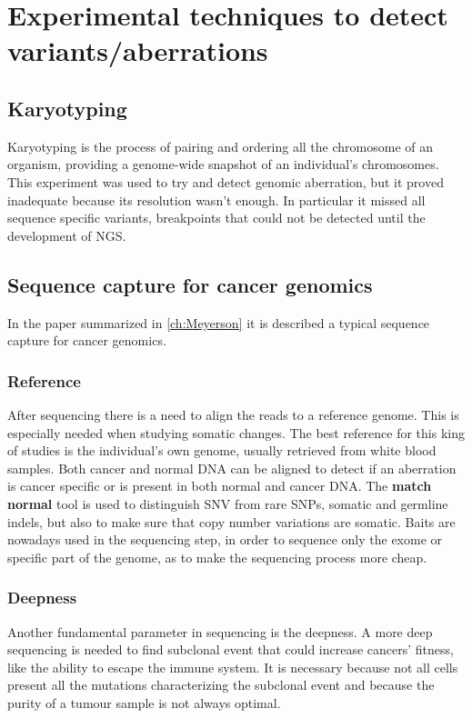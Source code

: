 \section{Experimental techniques to detect variants/aberrations}

	\subsection{Karyotyping}
	Karyotyping is the process of pairing and ordering all the chromosome of an organism, providing a genome-wide snapshot of an individual's chromosomes.
	This experiment was used to try and detect genomic aberration, but it proved inadequate because its resolution wasn't enough.
	In particular it missed all sequence specific variants, breakpoints that could not be detected until the development of NGS.

	\subsection{Sequence capture for cancer genomics}
	In the paper summarized in \ref{ch:Meyerson} it is described a typical sequence capture for cancer genomics.

		\subsubsection{Reference}
		After sequencing there is a need to align the reads to a reference genome.
		This is especially needed when studying somatic changes.
		The best reference for this king of studies is the individual's own genome, usually retrieved from white blood samples.
		Both cancer and normal DNA can be aligned to detect if an aberration is cancer specific or is present in both normal and cancer DNA.
		The \textbf{match normal} tool is used to distinguish SNV from rare SNPs, somatic and germline indels, but also to make sure that copy number variations are somatic.
		Baits are nowadays used in the sequencing step, in order to sequence only the exome or specific part of the genome, as to make the sequencing process more cheap.

		\subsubsection{Deepness}
		Another fundamental parameter in sequencing is the deepness.
		A more deep sequencing is needed to find subclonal event that could increase cancers' fitness, like the ability to escape the immune system.
		It is necessary because not all cells present all the mutations characterizing the subclonal event and because the purity of a tumour sample is not always optimal.


